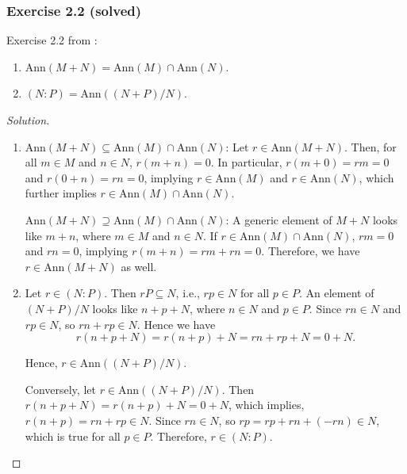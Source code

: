 \subsubsection{\cite{AtiyahMacdonald} Exercise 2.2 (solved)}
Exercise 2.2 from \cite{AtiyahMacdonald}:
\begin{exercise}[Exercise 2.2]
    \begin{enumerate}[label=\roman*)]
        \item \(\text{Ann}(M+N) = \text{Ann}(M) \cap \text{Ann}(N)\).
        \item \((N:P) = \text{Ann}((N + P)/N)\).
    \end{enumerate}
\end{exercise}
\begin{proof}[Solution]
    \begin{enumerate}[label=\roman*)]
        \item \(\text{Ann}(M+N) \subseteq \text{Ann}(M) \cap \text{Ann}(N)\): Let \(r \in \text{Ann}(M+N) \). Then, for all \(m \in M\) and  \(n \in N\), \(r(m+n) = 0\). In particular,  \(r(m+0) = rm = 0\) and  \(r(0+n) = rn = 0\), implying  \(r \in \text{Ann}(M)\) and  \(r \in \text{Ann}(N)\), which further implies \(r \in \text{Ann}(M) \cap \text{Ann}(N)\).

            \(\text{Ann}(M+N) \supseteq \text{Ann}(M) \cap \text{Ann}(N)\): A generic element of \(M + N\) looks like  \( m + n\), where  \(m \in M\) and  \(n \in N\). If \(r \in \text{Ann}(M) \cap \text{Ann}(N)\), \(rm = 0\) and  \(rn = 0\), implying  \(r(m+n) = rm + rn = 0\). Therefore, we have \(r \in \text{Ann}(M+N)\) as well.
        \item Let \(r \in (N: P)\). Then  \(rP \subseteq N\), i.e., \(rp \in N\) for all  \(p \in P\). An element of \((N+P)/N\) looks like \(n + p + N\), where  \(n \in N\) and  \(p \in P\). Since \(rn \in N\) and  \(rp \in N\), so \(rn + rp \in N\). Hence we have 
            \[
            r(n + p + N) = r(n+p)+N = rn + rp + N = 0 + N.
            \] 

            Hence, \(r \in \text{Ann}((N+P)/N)\).

            Conversely, let \(r \in \text{Ann}((N+P)/N)\). Then \(r(n+p + N) = r(n + p) + N = 0 + N\), which implies, \(r(n+p) = rn + rp \in N\). Since  \(rn \in N\), so  \(rp = rp + rn + (- rn) \in N\), which is true for all \(p \in P\). Therefore, \(r \in (N: P)\).
    \end{enumerate}
\end{proof}

